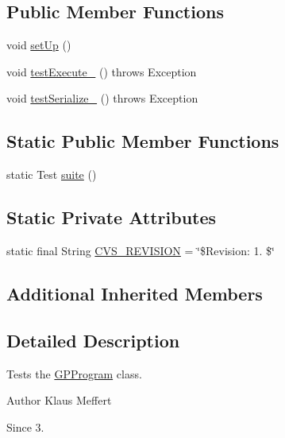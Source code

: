 \subsection*{Public Member Functions}
\begin{DoxyCompactItemize}
\item 
void \hyperlink{classorg_1_1jgap_1_1gp_1_1impl_1_1_g_p_program_test_a4c04618ffd554efe8a46f44b95f444b2}{set\-Up} ()
\item 
void \hyperlink{classorg_1_1jgap_1_1gp_1_1impl_1_1_g_p_program_test_ab4c13af03245854482df545e1d41985d}{test\-Execute\-\_} ()  throws Exception 
\item 
void \hyperlink{classorg_1_1jgap_1_1gp_1_1impl_1_1_g_p_program_test_a0e6232d5c2d508756d21c8f638d80231}{test\-Serialize\-\_} ()  throws Exception 
\end{DoxyCompactItemize}
\subsection*{Static Public Member Functions}
\begin{DoxyCompactItemize}
\item 
static Test \hyperlink{classorg_1_1jgap_1_1gp_1_1impl_1_1_g_p_program_test_ab35f06a84cd8f1df37f10770983af55e}{suite} ()
\end{DoxyCompactItemize}
\subsection*{Static Private Attributes}
\begin{DoxyCompactItemize}
\item 
static final String \hyperlink{classorg_1_1jgap_1_1gp_1_1impl_1_1_g_p_program_test_aa2739f9d80a246bae986170d45076246}{C\-V\-S\-\_\-\-R\-E\-V\-I\-S\-I\-O\-N} = \char`\"{}\$Revision\-: 1. \$\char`\"{}
\end{DoxyCompactItemize}
\subsection*{Additional Inherited Members}


\subsection{Detailed Description}
Tests the \hyperlink{classorg_1_1jgap_1_1gp_1_1impl_1_1_g_p_program}{G\-P\-Program} class.

\begin{DoxyAuthor}{Author}
Klaus Meffert 
\end{DoxyAuthor}
\begin{DoxySince}{Since}
3. 
\end{DoxySince}


